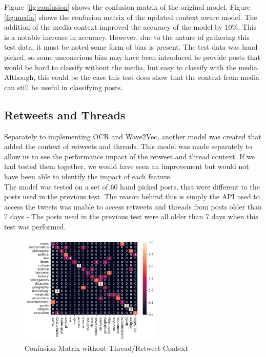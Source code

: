 Figure \ref{fig:confusion} shows the confusion matrix of the original model. Figure \ref{fig:media} shows the confusion matrix of the
updated context aware model. The addition of the media context improved the accuracy of the model by $10\%$. This is a notable increase
in accuracy. However, due to the nature of gathering this test data, it must be noted some form of bias is present. The test data was
hand picked, so some unconscious bias may have been introduced to provide posts that would be hard to classify without the media,
but easy to classify with the media. Although, this could be the case this test does show that the context from media can still be useful
in classifying posts.\\
\subsection{Retweets and Threads}
Separately to implementing OCR and Wave2Vec, another model was created that added the context of retweets and threads. This model was
made separately to allow us to see the performance impact of the retweet and thread context. If we had tested them together, we would
have seen an improvement but would not have been able to identify the impact of each feature.\\
The model was tested on a set of 60 hand picked posts, that were different to the posts used in the previous test. The reason behind
this is simply the API used to access the tweets was unable to access retweets and threads from posts older than 7 days - The posts
used in the previous test were all older than 7 days when this test was performed.
\begin{figure}
    \centering
    \includegraphics[width=0.6\textwidth]{../images/confusion/RoBERTa-nothread-20.png}
    \caption{Confusion Matrix without Thread/Retweet Context}
    \label{fig:confusion2}
\end{figure}
